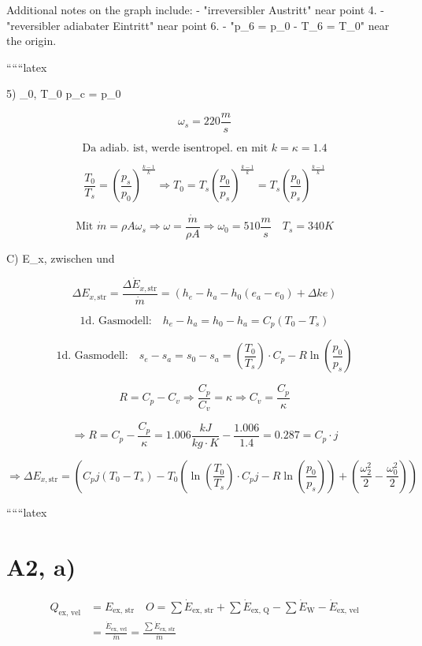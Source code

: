 Additional notes on the graph include:
- "irreversibler Austritt" near point 4.
- "reversibler adiabater Eintritt" near point 6.
- "p_6 = p_0 - T_6 = T_0" near the origin.

``````latex


5) \quad \omega_0, T_0  \quad p_c = p_0

\[
\omega_s = 220 \frac{m}{s}
\]


\[
\text{Da adiab. ist, werde isentropel. en mit } k = \kappa = 1.4
\]

\[
\frac{T_0}{T_s} = \left( \frac{p_s}{p_0} \right)^{\frac{k-1}{k}} \Rightarrow T_0 = T_s \left( \frac{p_0}{p_s} \right)^{\frac{k-1}{k}} = T_s \left( \frac{p_0}{p_s} \right)^{\frac{k-1}{k}}
\]

\[
\text{Mit } \dot{m} = \rho A \omega_s \Rightarrow \omega = \frac{\dot{m}}{\rho A} \Rightarrow \omega_0 = 510 \frac{m}{s} \quad T_s = 340 K
\]

C) \quad \Delta E_{x, } \quad zwischen  \quad und 

\[
\Delta E_{x, \text{str}} = \frac{\Delta \dot{E}_{x, \text{str}}}{\dot{m}} = (h_e - h_a - h_0 (e_a - e_0) + \Delta ke)
\]

\[
\text{1d. Gasmodell:} \quad h_e - h_a = h_0 - h_a = C_p (T_0 - T_s)
\]

\[
\text{1d. Gasmodell:} \quad s_e - s_a = s_0 - s_a = \left( \frac{T_0}{T_s} \right) \cdot C_p - R \ln \left( \frac{p_0}{p_s} \right)
\]

\[
R = C_p - C_v \Rightarrow \frac{C_p}{C_v} = \kappa \Rightarrow C_v = \frac{C_p}{\kappa}
\]

\[
\Rightarrow R = C_p - \frac{C_p}{\kappa} = 1.006 \frac{kJ}{kg \cdot K} - \frac{1.006}{1.4} = 0.287 = C_p \cdot j
\]

\[
\Rightarrow \Delta E_{x, \text{str}} = \left( C_p j (T_0 - T_s) - T_0 \left( \ln \left( \frac{T_0}{T_s} \right) \cdot C_p j - R \ln \left( \frac{p_0}{p_s} \right) \right) + \left( \frac{\omega_2^2}{2} - \frac{\omega_0^2}{2} \right) \right)
\]

``````latex


\section*{A2, a)}

\begin{align*}
Q_{\text{ex, vel}} &= E_{\text{ex, str}} \quad O = \sum \dot{E}_{\text{ex, str}} + \sum \dot{E}_{\text{ex, Q}} - \sum \dot{E}_{\text{W}} - \dot{E}_{\text{ex, vel}} \\
&= \frac{\dot{E}_{\text{ex, vel}}}{\dot{m}} = \frac{\sum \dot{E}_{\text{ex, str}}}{\dot{m}}
\end{align*}

